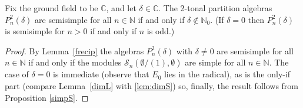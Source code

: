 \documentclass[reqno,10pt,a4paper]{amsart}
\newcommand{\C}{\mathbb{C}}
\newcommand{\N}{\mathbb{N}}
\newcommand{\blue}[1]{\textcolor{blue}{#1}}
\newcommand{\red}[1]{\textcolor{red}{#1}}
\newcommand{\ppm}[1]{\red{#1}}
\newcommand{\ppmm}[1]{{#1}}
\newcommand{\ca}[1]{\blue{#1}}
\newcommand{\nk}{n}  %
\newcommand{\cell}{\mathcal{S}}
\begin{document}
\begin{thm}
\label{th:main}
Fix %
{the ground field to be $\C$, and }
let $\delta\in \mathbb{C}$. 
{
The 2-tonal partition algebras $P^2_\nk(\delta)$ are semisimple for all $\nk \in \N$
if and only if  
$\delta\not\in\N_0$. 
\ppmm{(If $\delta=0$ then $P^2_\nk(\delta)$ is semisimple for $\nk>0$ if and only if  $\nk$ is odd.)}}
\end{thm}
\begin{proof}
{By Lemma~\ref{frecip} the algebras $P^2_\nk(\delta)$ 
with $\delta\neq 0$ 
are semisimple for all $\nk \in \N$ if and only if 
the modules}
{$\cell_\nk({\emptyset}/{(1)},\emptyset)$ are simple for all $\nk \in \N$. }
The case of $\delta=0$ is immediate (observe that $E_0$ lies in the radical),
as is the only-if part 
(compare Lemma~\ref{dimL} with \ref{lem:dimS})
so, 
finally, the result follows from Proposition \ref{simpS}. 
\end{proof}

\medskip 

\medskip 

\appendix 
\end{document}
